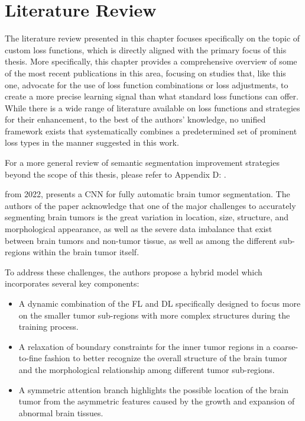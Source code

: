 \chapter{Literature Review}
\label{chap:literature_review}
The literature review presented in this chapter focuses specifically on the topic of custom loss functions, which is directly aligned with the primary focus of this thesis.  More specifically, this chapter provides a comprehensive overview of some of the most recent publications in this area, focusing on studies that, like this one, advocate for the use of loss function combinations or loss adjustments, to create a more precise learning signal than what standard loss functions can offer. While there is a wide range of literature available on loss functions and strategies for their enhancement, to the best of the authors' knowledge, no unified framework exists that systematically combines a predetermined set of prominent loss types in the manner suggested in this work.

For a more general review of semantic segmentation improvement strategies beyond the scope of this thesis, please refer to Appendix D: .

 \cite{WANG2022102259} from 2022, presents a \ac{CNN} for fully automatic brain tumor segmentation. The authors of the paper acknowledge that one of the major challenges to accurately segmenting brain tumors is the great variation in location, size, structure, and morphological appearance, as well as the severe data imbalance that exist between brain tumors and non-tumor tissue, as well as among the different sub-regions within the brain tumor itself.

To address these challenges, the authors propose a hybrid model which incorporates several key components:
\begin{itemize}
    \item A dynamic combination of the \ac{FL} and \ac{DL} specifically designed to focus more on the smaller tumor sub-regions with more complex structures during the training process.
    \item A relaxation of boundary constraints for the inner tumor regions in a coarse-to-fine fashion to better recognize the overall structure of the brain tumor and the morphological relationship among different tumor sub-regions.
    \item A symmetric attention branch highlights the possible location of the brain tumor from the asymmetric features caused by the growth and expansion of abnormal brain tissues.
\end{itemize}

